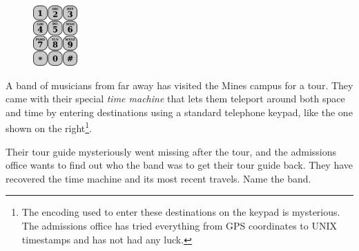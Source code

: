 \documentclass{puzz}
\begin{document}
\setlength\intextsep{0pt}

\begin{figure}
    \centering
    \includegraphics[width=0.15\textwidth]{graphics/keypad}
\end{figure}

A band of musicians from far away has visited the Mines campus for a tour. They
came with their special \emph{time machine} that lets them teleport around both
space and time by entering destinations using a standard telephone keypad, like
the one shown on the right\footnote{The encoding used to enter these
destinations on the keypad is mysterious. The admissions office has tried
everything from GPS coordinates to UNIX timestamps and has not had any luck.}.

Their tour guide mysteriously went missing after the tour, and the admissions
office wants to find out who the band was to get their tour guide back. They
have recovered the time machine and its most recent travels. Name the band.

\vfill
\end{document}
